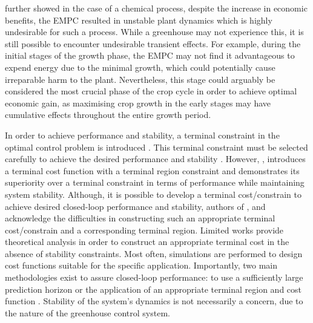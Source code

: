 \cite{rawlingsFundamentalsEconomicModel2012} further showed  in the case of a chemical process, despite the increase in economic benefits, the EMPC  resulted in unstable plant dynamics which is highly undesirable for such a process. While a greenhouse may not experience this, it is still possible to encounter undesirable transient effects. For example, during the initial stages of the growth phase, the EMPC may not find it advantageous to expend energy due to the minimal growth, which could potentially cause irreparable harm to the plant. Nevertheless, this stage could arguably be considered the most crucial phase of the crop cycle in order to achieve optimal economic gain, as maximising crop growth in the early stages may have cumulative effects throughout the entire growth period.

 In order to achieve performance and stability, a terminal constraint in the optimal control problem is introduced \cite{amritEconomicOptimizationUsing2011}. This terminal constraint must be selected carefully to achieve the desired performance and stability \cite{rawlingsFundamentalsEconomicModel2012}. However, \cite{amritEconomicOptimizationUsing2011}, introduces a terminal cost function with a terminal region constraint and demonstrates its superiority over a terminal constraint in terms of performance while maintaining system stability. Although, it is possible to develop a terminal cost/constrain to achieve desired closed-loop performance and stability, authors of \cite{rawlingsFundamentalsEconomicModel2012}, \cite{amritEconomicOptimizationUsing2011} and \cite{ellisTutorialReviewEconomic2014} acknowledge the difficulties in constructing such an appropriate terminal cost/constrain and a corresponding terminal region. Limited works provide theoretical analysis in order to construct an appropriate terminal cost in the absence of stability constraints. Most often, simulations are performed to design cost functions suitable for the specific application. Importantly, two main methodologies exist to assure closed-loop performance: to use a sufficiently large prediction horizon or the application of an appropriate terminal region and cost function \cite{ellisTutorialReviewEconomic2014}. Stability of the system's dynamics is not necessarily a concern, due to the nature of the greenhouse control system.


